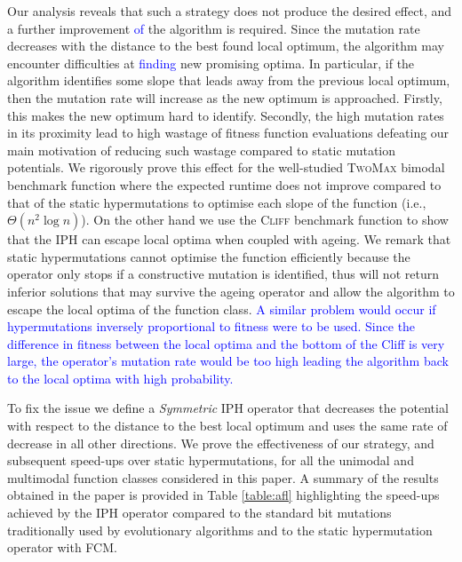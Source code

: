 \documentclass[lettersize,journal]{IEEEtran}
\newcommand{\new}[1]{\textcolor{blue}{#1}}
\begin{document}
Our analysis reveals that such a strategy does not produce the desired effect, and a further improvement \new{of} the algorithm is required.
Since the mutation rate decreases with the distance to the best found local optimum, the algorithm may encounter difficulties at \new{finding} new promising optima. 
In particular, if the algorithm identifies some slope that leads away from the previous local optimum, then the mutation rate will increase as the new optimum is approached.
Firstly, this makes the new optimum hard to identify. Secondly, the high mutation rates in its proximity lead to high wastage of fitness function evaluations defeating our main motivation of reducing
such wastage compared to static mutation potentials. We rigorously prove this effect for the well-studied \textsc{TwoMax} bimodal benchmark function where the expected runtime does not improve compared to that of the static hypermutations to optimise each slope of the function (i.e., $\Theta(n^2 \log{n})$). On the other hand we use the \textsc{Cliff} benchmark function to show that the IPH can escape local optima when coupled with ageing. We remark that static hypermutations cannot optimise the function efficiently because %
the operator only stops if a constructive mutation is identified, thus will not return inferior solutions that may survive the ageing operator and allow the algorithm to escape the local optima of the function class.
\new{A similar problem would occur if hypermutations inversely proportional to fitness were to be used. Since the difference in fitness between the local optima and the bottom of the Cliff is very large, the operator's mutation rate would be too high leading the algorithm back to the local optima with high probability.}

To fix the issue we define a {\it Symmetric} IPH operator that decreases the potential with respect to the distance to the best local optimum and uses the same rate of decrease in all other directions.
We prove the effectiveness of our strategy, and subsequent speed-ups over static hypermutations, %
for all the unimodal and multimodal function classes considered in this paper. 
A summary of the results obtained in the paper is provided in Table \ref{table:afl} highlighting the speed-ups achieved by the IPH operator compared to the standard bit mutations traditionally  used by evolutionary algorithms and to the static hypermutation operator with FCM.
\end{document}

